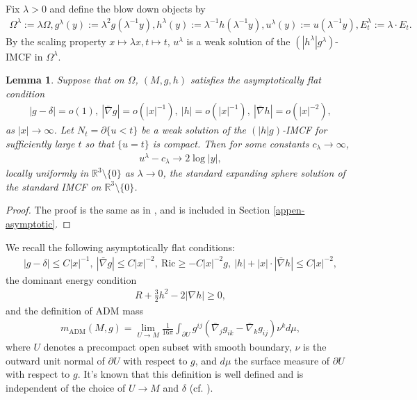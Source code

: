 \documentclass[11pt, letterpaper]{amsart}
\newtheorem{lem}[thm]{Lemma}
\theoremstyle{definition}
\theoremstyle{remark}
\begin{document}
Fix $\lambda >0$ and define the blow down objects by
\begin{align*}
	\Omega ^{\lambda }:= \lambda \Omega , g ^{\lambda }(y) := \lambda ^2 g(\lambda ^{-1}y), h ^{\lambda }(y):= \lambda ^{-1} h(\lambda ^{-1} y), u ^{\lambda }(y) := u(\lambda ^{-1} y),  E ^{\lambda }_t:= \lambda \cdot E_t.
\end{align*} 
By the scaling property $x \mapsto \lambda x, t \mapsto t$, $u ^{\lambda }$ is a weak solution of the $(|h ^{\lambda }| g ^{\lambda })$-IMCF in $\Omega ^{\lambda }$.

\begin{lem}\label{lem-blowdown}
	Suppose that on $\Omega $, $(M, g, h)$ satisfies the asymptotically flat condition
	\begin{align*}
		|g - \delta | = o(1),\ |\bar{\nabla }g| = o (|x| ^{-1}), \ |h| = o(|x| ^{-1}),\ |\bar{\nabla }h| = o(|x| ^{-2}),
	\end{align*} 
	as $|x| \to \infty$. Let $N_t = \partial \{ u < t\} $ be a weak solution of the $(|h| g)$-IMCF for sufficiently large $t$ so that $\{ u =t\} $ is compact. Then for some constants $c_{\lambda } \to \infty$,
	\begin{align*}
		u ^{\lambda } - c_{\lambda } \to 2 \log |y|,
	\end{align*} 
	locally uniformly in $\mathbb{R}^{3} \setminus \{ 0\} $ as $\lambda \to 0$, the standard expanding sphere solution of the standard IMCF on $\mathbb{R}^{3} \setminus \{0\} $.
\end{lem}
\begin{proof}
	The proof is the same as in \cite[Lemma 7.1]{HI01}, and is included in Section \ref{appen-asymptotic}.  
\end{proof}

We recall the following asymptotically flat conditions: 
\begin{align}\label{AF-condition-recall}
	|g-\delta | \leq C |x| ^{-1}, \ |\bar{\nabla }g| \leq C |x| ^{-2}, \ \mathrm{Ric} \geq - C |x| ^{-2} g,\ |h| + |x|\cdot |\bar{\nabla } h| \leq C |x| ^{-2},
\end{align}
the dominant energy condition
\begin{align}\label{DEC-h-recall}
	R + \frac{3}{2} h ^2 - 2 |\nabla h| \geq 0,
\end{align}
and the definition of ADM mass
\begin{align}
	m_{\mathrm{ADM}}(M, g) = \lim_{U \to M}   \frac{1}{16 \pi } \int_{\partial U} g ^{ij} \left( \bar{\nabla } _j g_{ik} - \bar{\nabla }_{k} g_{ij} \right) \nu ^{k} d \mu ,
\end{align}
where $U$ denotes a precompact open subset with smooth boundary, $\nu $ is the outward unit normal of $\partial U$ with respect to $g$, and $d \mu $ the surface measure of $\partial U$ with respect to $g$.
It's known that this definition is well defined and is independent of the choice of $U \to M$ and $\delta $ (cf. \cite{ADM61, Bartnik86, Chrusciel86}). 
\end{document}
